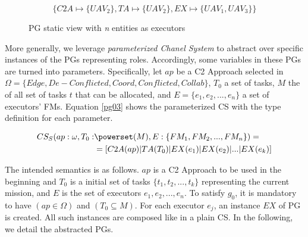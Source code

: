 \begin{center}
\begin{equation}
\{ C2A \mapsto \{UAV_2\}  , TA \mapsto \{UAV_2\} ,  EX \mapsto \{UAV_1, UAV_3\}\}
 \end{equation}
\end{center}


\begin{figure}[h]
\centering

\label{pg}
\caption{PG static view with \textit{n} entities as executors}
\end{figure}





More generally, we leverage \textit{parameterized Chanel System} to abstract over specific instances of the PGs representing roles. Accordingly, some variables in these PGs are turned into parameters. Specifically, let $ap$ be a C2 Approach selected in $\Omega = \{Edge, De-Conflicted, Coord, Conflicted, Collab\}$, $T_0$ a set of tasks, $M$ the of all set of tasks $t$ that can be allocated,  and $E = \{e_1, e_2, ..., e_n\}$ a set of executors' FMs. Equation \ref{pg03} shows the  parameterized CS with the type definition for each parameter. 

\begin{equation}
\label{pg03}
\begin{split}
CS_S(ap:\omega, T_0: &\powerset(M), E:\{FM_1, FM_2, ..., FM_n\})=\\
&=[ C2A(ap) | TA(T_0) | EX(e_1) | EX(e_2) | ... | EX(e_k) ]
\end{split}
\end{equation}

The intended semantics is as follows. $ap$ is a C2 Approach to be used in the beginning and $T_0$ is a initial set of tasks $\{t_1, t_2, ..., t_k\}$ representing the current mission, and $E$ is the set of executors ${e_1, e_2, ..., e_n}$. To satisfy $g_0$, it is mandatory to have $(ap \in \Omega)$ and $(T_0 \subseteq M)$. For each executor $e_j$,  an instance $EX$ of PG is created. All such instances are composed like in a plain CS. In the following, we detail the abstracted PGs.


